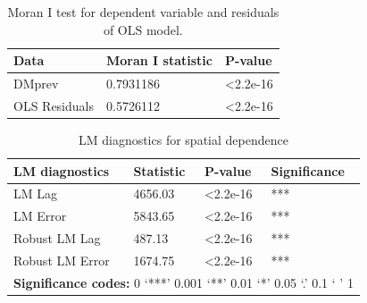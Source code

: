 \begin{table}[]
\centering
\begin{tabular}{|l|l|l|}
\hline
\textbf{Data} & \textbf{Moran I statistic} & \textbf{P-value}  \\ \hline
DMprev        & 0.7931186                  & \textless 2.2e-16 \\ \hline
OLS Residuals & 0.5726112                  & \textless 2.2e-16 \\ \hline
\end{tabular}
\caption{
Moran I test for dependent variable and residuals of OLS model.
}
\label{tab: A4.3}
\end{table}


\begin{table}[]
\centering
\begin{tabular}{|l|l|l|l|}
\hline
\textbf{LM diagnostics} & \textbf{Statistic} & \textbf{P-value} & \textbf{Significance} \\ \hline
LM Lag                  & 4656.03            & \textless 2.2e-16 & ***                   \\ \hline
LM Error                & 5843.65            & \textless 2.2e-16 & ***                   \\ \hline
Robust LM Lag           & 487.13             & \textless 2.2e-16 & ***                   \\ \hline
Robust LM Error         & 1674.75            & \textless 2.2e-16 & ***                   \\ \hline \hline
\multicolumn{4}{|l|}{\textbf{Significance codes:} 0 ‘***’ 0.001 ‘**’ 0.01 ‘*’ 0.05 ‘.’ 0.1 ‘ ’ 1} \\ \hline
\end{tabular}
\caption{
LM diagnostics for spatial dependence
}
\label{tab: A4.4}
\end{table}


